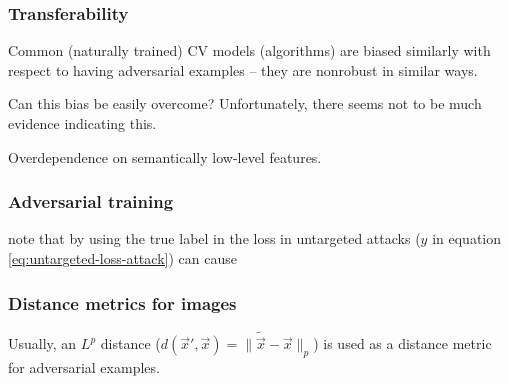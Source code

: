 \documentclass{article}
\begin{document}
\subsubsection{Transferability}

Common (naturally trained) CV models (algorithms) are biased similarly with respect to having adversarial examples -- they are nonrobust in similar ways. 

Can this bias be easily overcome? Unfortunately, there seems not to be much evidence indicating this.

Overdependence on semantically low-level features.

\subsubsection{Adversarial training}

\cite{Kurakin:2016:AMLS} note that by using the true label in the loss in untargeted attacks ($y$ in equation \eqref{eq:untargeted-loss-attack}) can cause

\subsubsection{Distance metrics for images}

Usually, an $L^p$ distance ($d(\vec x', \vec x)=\lVert\tilde{\vec x}-\vec x\rVert_p$) is used as a distance metric for adversarial examples.
\end{document}
